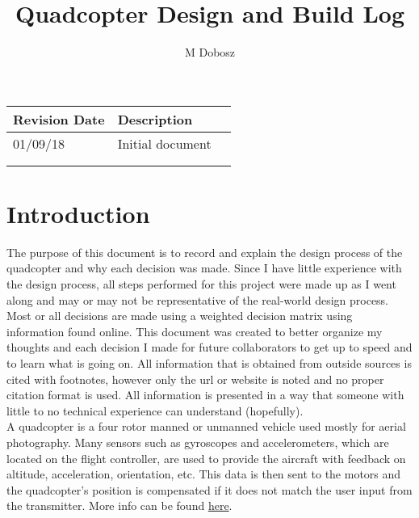 \documentclass[12pt]{article}
\title{Quadcopter Design and Build Log}
\author{M Dobosz}
\begin{document}
\begin{titlepage}
\vspace*{-4.5cm}
\hspace*{-4.1cm}
{\let\newpage\relax\maketitle}

\begin{table}[b]
\begin{center}
\begin{tabular}{| l | l | l |}
\hline
\textbf{Revision Date} & \textbf{Description} \\ \hline
01/09/18 & Initial document \\ \hline
& \\ \hline
& \\ \hline

\end{tabular}
\end{center}
\end{table}
\end{titlepage}


\pagebreak
\tableofcontents
\pagebreak

\section{Introduction}

The purpose of this document is to record and explain the design process of the quadcopter and why each decision was made. Since I have little experience with the design process, all steps performed for this project were made up as I went along and may or may not be representative of the real-world design process. Most or all decisions are made using a weighted decision matrix using information found online. This document was created to better organize my thoughts and each decision I made for future collaborators to get up to speed and to learn what is going on. All information that is obtained from outside sources is cited with footnotes, however only the url or website is noted and no proper citation format is used. All information is presented in a way that someone with little to no technical experience can understand (hopefully).
\\

A quadcopter is a four rotor manned or unmanned vehicle used mostly for aerial photography. Many sensors such as gyroscopes and accelerometers, which are located on the flight controller, are used to provide the aircraft with feedback on altitude, acceleration, orientation, etc. This data is then sent to the motors and the quadcopter's position is compensated if it does not match the user input from the transmitter. More info can be found \href{https://en.wikipedia.org/wiki/Quadcopter}{\color{cyan}here}.
\end{document}
